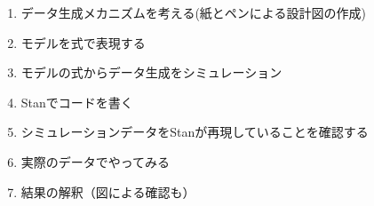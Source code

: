 \begin{enumerate}
	\item データ生成メカニズムを考える(紙とペンによる設計図の作成)
	\item モデルを式で表現する
	\item モデルの式からデータ生成をシミュレーション
	\item Stanでコードを書く
	\item シミュレーションデータをStanが再現していることを確認する
	\item 実際のデータでやってみる
	\item 結果の解釈（図による確認も）
\end{enumerate}

